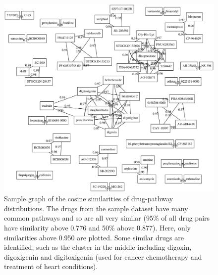 \documentclass[12pt,a4]{article}
\begin{document}
\begin{figure}[!htb]
\includegraphics[width=\textwidth]{progress-report-drugs.eps}
\caption{Sample graph of the cosine similarities of drug-pathway distributions. The drugs from the sample dataset have many common pathways and so are all very similar (95\% of all drug pairs have similarity above 0.776 and 50\% above 0.877). Here, only similarities above 0.950 are plotted. Some similar drugs are identified, such as the cluster in the middle including digoxin, digoxigenin and digitoxigenin (used for cancer chemotherapy and treatment of heart conditions).}
\end{figure}
\end{document}
